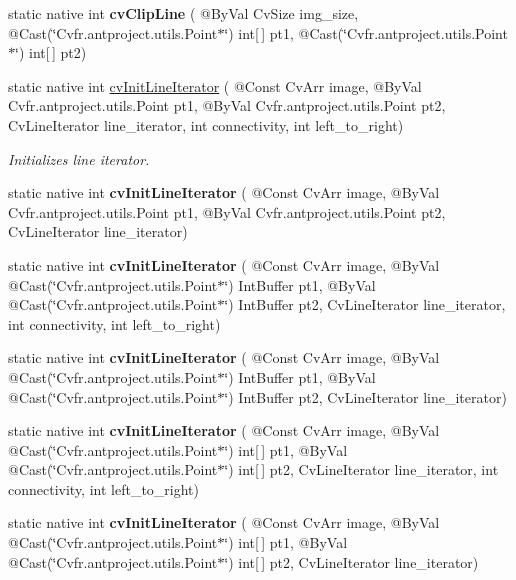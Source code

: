 \begin{DoxyCompactItemize}
\item 
static native int {\bfseries cv\+Clip\+Line} ( @By\+Val Cv\+Size img\+\_\+size, @Cast(\char`\"{}Cv\+fr.antproject.utils.Point$\ast$\char`\"{}) int\mbox{[}$\,$\mbox{]} pt1, @Cast(\char`\"{}Cv\+fr.antproject.utils.Point$\ast$\char`\"{}) int\mbox{[}$\,$\mbox{]} pt2)
\item 
static native int \hyperlink{group__imgproc__c_gac6827dd42663e5c95d5c78bd9bce2470}{cv\+Init\+Line\+Iterator} ( @Const Cv\+Arr image, @By\+Val Cv\+fr.antproject.utils.Point pt1, @By\+Val Cv\+fr.antproject.utils.Point pt2, Cv\+Line\+Iterator line\+\_\+iterator, int connectivity, int left\+\_\+to\+\_\+right)
\begin{DoxyCompactList}\small\item\em Initializes line iterator. \end{DoxyCompactList}\item 
static native int {\bfseries cv\+Init\+Line\+Iterator} ( @Const Cv\+Arr image, @By\+Val Cv\+fr.antproject.utils.Point pt1, @By\+Val Cv\+fr.antproject.utils.Point pt2, Cv\+Line\+Iterator line\+\_\+iterator)
\item 
static native int {\bfseries cv\+Init\+Line\+Iterator} ( @Const Cv\+Arr image, @By\+Val @Cast(\char`\"{}Cv\+fr.antproject.utils.Point$\ast$\char`\"{}) Int\+Buffer pt1, @By\+Val @Cast(\char`\"{}Cv\+fr.antproject.utils.Point$\ast$\char`\"{}) Int\+Buffer pt2, Cv\+Line\+Iterator line\+\_\+iterator, int connectivity, int left\+\_\+to\+\_\+right)
\item 
static native int {\bfseries cv\+Init\+Line\+Iterator} ( @Const Cv\+Arr image, @By\+Val @Cast(\char`\"{}Cv\+fr.antproject.utils.Point$\ast$\char`\"{}) Int\+Buffer pt1, @By\+Val @Cast(\char`\"{}Cv\+fr.antproject.utils.Point$\ast$\char`\"{}) Int\+Buffer pt2, Cv\+Line\+Iterator line\+\_\+iterator)
\item 
static native int {\bfseries cv\+Init\+Line\+Iterator} ( @Const Cv\+Arr image, @By\+Val @Cast(\char`\"{}Cv\+fr.antproject.utils.Point$\ast$\char`\"{}) int\mbox{[}$\,$\mbox{]} pt1, @By\+Val @Cast(\char`\"{}Cv\+fr.antproject.utils.Point$\ast$\char`\"{}) int\mbox{[}$\,$\mbox{]} pt2, Cv\+Line\+Iterator line\+\_\+iterator, int connectivity, int left\+\_\+to\+\_\+right)
\item 
static native int {\bfseries cv\+Init\+Line\+Iterator} ( @Const Cv\+Arr image, @By\+Val @Cast(\char`\"{}Cv\+fr.antproject.utils.Point$\ast$\char`\"{}) int\mbox{[}$\,$\mbox{]} pt1, @By\+Val @Cast(\char`\"{}Cv\+fr.antproject.utils.Point$\ast$\char`\"{}) int\mbox{[}$\,$\mbox{]} pt2, Cv\+Line\+Iterator line\+\_\+iterator)

\end{DoxyCompactItemize}
